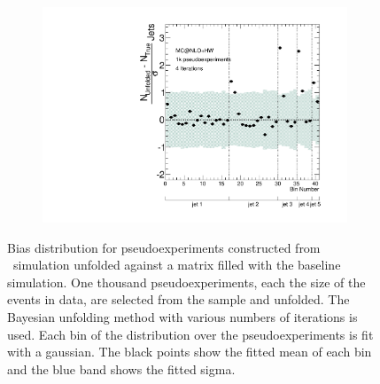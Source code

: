 \begin{figure}
\begin{subfigure}[]{0.5\textwidth}
\end{subfigure}
\begin{subfigure}[]{0.5\textwidth}
\includegraphics[width=\textwidth]{fig/Stress/105200atlfast/Pull4Iterations.pdf}
\end{subfigure}
\caption{Bias distribution for pseudoexperiments constructed from \newline \mcnlohw\ simulation unfolded against a matrix filled with the baseline simulation. One thousand pseudoexperiments, each the size of the events in data, are selected from the sample and unfolded. The Bayesian unfolding method with various numbers of iterations is used. Each bin of the distribution over the pseudoexperiments is fit with a gaussian. The black points show the fitted mean of each bin and the blue band shows the fitted sigma.}
\label{fig:mcnlopull}
\end{figure}
\clearpage
